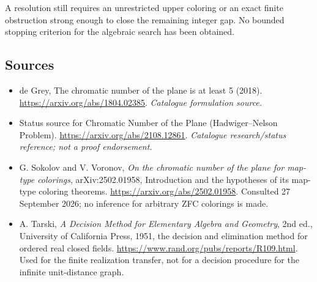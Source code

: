 \documentclass[11pt,a4paper]{article}
\numberwithin{equation}{section}
\begin{document}
A resolution still requires an unrestricted upper coloring or an exact
finite obstruction strong enough to close the remaining integer gap.
No bounded stopping criterion for the algebraic search has been obtained.
\subsection{Sources}
\begin{itemize}\raggedright
\item[\textnormal{[S1]}]\hypertarget{source:10:1}{} de Grey, The chromatic number of the plane is at least 5 (2018).
\url{https://arxiv.org/abs/1804.02385}.
{\small\textit{Catalogue formulation source.}}
\item[\textnormal{[S2]}]\hypertarget{source:10:2}{} Status source for Chromatic Number of the Plane (Hadwiger--Nelson Problem).
\url{https://arxiv.org/abs/2108.12861}.
{\small\textit{Catalogue research/status reference; not a proof endorsement.}}
\item[\textnormal{[E1]}]\hypertarget{extra:10:1}{}
G. Sokolov and V. Voronov, \emph{On the chromatic number of the plane for map-type
colorings}, arXiv:2502.01958, Introduction and the hypotheses of its
map-type coloring theorems. \url{https://arxiv.org/abs/2502.01958}.
Consulted 27 September 2026; no inference for arbitrary ZFC colorings is made.
\item[\textnormal{[E2]}]\hypertarget{extra:10:2}{}
A. Tarski, \emph{A Decision Method for Elementary Algebra and Geometry},
2nd ed., University of California Press, 1951, the decision and elimination
method for ordered real closed fields.
\url{https://www.rand.org/pubs/reports/R109.html}.
Used for the finite realization transfer, not for a decision procedure
for the infinite unit-distance graph.
\end{itemize}
\end{document}
